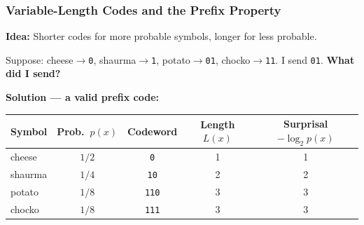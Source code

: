 \documentclass[aspectratio=169]{beamer}
\begin{document}
\begin{frame}
\frametitle{Variable-Length Codes and the Prefix Property}

\small
\textbf{Idea:} Shorter codes for more probable symbols, longer for less probable.

\vspace{0.05cm}
Suppose: \;cheese$\to$\texttt{0}, \;shaurma$\to$\texttt{1}, \;potato$\to$\texttt{01}, \;chocko$\to$\texttt{11}.
\;\;I send \texttt{01}. \textbf{What did I send?}

\pause
\vspace{0.05cm}
\begin{center}
\end{center}

\vspace{0.05cm}
\begin{center}
\end{center}

\vspace{0.05cm}
\textbf{Solution --- a valid prefix code:}
\vspace{-0.1cm}
\begin{center}
\renewcommand{\arraystretch}{1.2}
\begin{tabular}{lcccc}
  \textbf{Symbol} & \textbf{Prob.}~$p(x)$ & \textbf{Codeword} & \textbf{Length} $L(x)$ & \textbf{Surprisal} $-\log_2 p(x)$ \\
  \hline
  cheese  & $1/2$ & \texttt{0}   & 1 & 1 \\
  shaurma & $1/4$ & \texttt{10}  & 2 & 2 \\
  potato  & $1/8$ & \texttt{110} & 3 & 3 \\
  chocko  & $1/8$ & \texttt{111} & 3 & 3 \\
  \hline
\end{tabular}
\end{center}
\end{frame}
\end{document}
